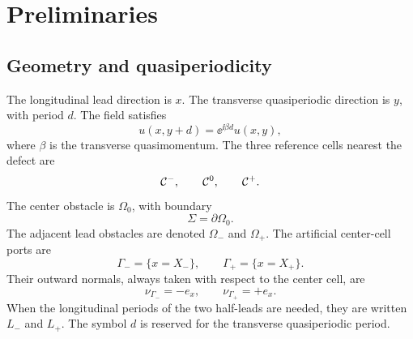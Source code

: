 %
%
%
%
%

\section{Preliminaries}

\subsection{Geometry and quasiperiodicity}

The longitudinal lead direction is \(x\).  The transverse quasiperiodic
direction is \(y\), with period \(d\).  The field satisfies
\[
  u(x,y+d)=\ee^{\ii\beta d}u(x,y),
\]
where \(\beta\) is the transverse quasimomentum.  The three reference cells
nearest the defect are
\[
  \mathcal C^-,
  \qquad
  \mathcal C^0,
  \qquad
  \mathcal C^+ .
\]
The center obstacle is \(\Omega_0\), with boundary
\[
  \Sigma=\partial\Omega_0 .
\]
The adjacent lead obstacles are denoted \(\Omega_-\) and \(\Omega_+\).  The
artificial center-cell ports are
\[
  \Gamma_-=\{x=X_-\},
  \qquad
  \Gamma_+=\{x=X_+\}.
\]
Their outward normals, always taken with respect to the center cell, are
\[
  \nu_{\Gamma_-}=-e_x,
  \qquad
  \nu_{\Gamma_+}=+e_x .
\]
When the longitudinal periods of the two half-leads are needed, they are written
\(L_-\) and \(L_+\).  The symbol \(d\) is reserved for the transverse
quasiperiodic period.

